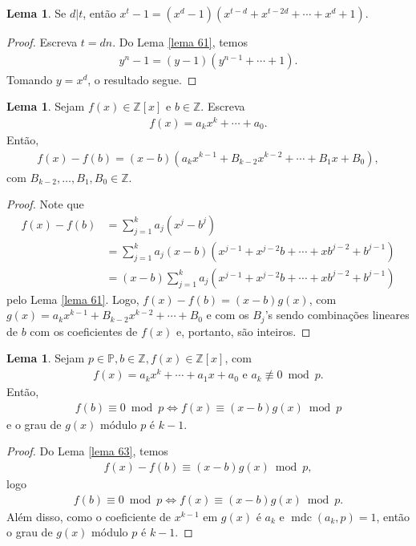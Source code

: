 \documentclass[a4paper,11pt,twoside, leqno]{article}
\DeclareMathOperator{\mdc}{mdc}
\theoremstyle{definition}
\newtheorem{lemma}[theorem]{Lema}
\begin{document}
\begin{lemma}
	\label{lema 62}
	Se $d|t$, então $x^t - 1 = (x^d - 1)(x^{t-d} + x^{t-2d} + \cdots + x^d + 1)$.
\end{lemma}
\begin{proof}
	Escreva $t = dn$. Do Lema \eqref{lema 61}, temos
	\begin{align*}
	y^n - 1 = (y-1)(y^{n-1} + \cdots + 1).
	\end{align*}
	Tomando $y = x^d$, o resultado segue.
\end{proof}
\begin{lemma}
	\label{lema 63}
	Sejam $f(x)\in\mathbb{Z}[x]$ e $b\in\mathbb{Z}$. Escreva
	\begin{align*}
	f(x) = a_kx^k + \cdots + a_0.
	\end{align*}
	Então, 
	\begin{align*}
	f(x) - f(b) = (x-b)(a_kx^{k-1} + B_{k-2}x^{k-2} + \cdots + B_1x + B_0),
	\end{align*}
	com $B_{k-2}, \dots, B_1, B_0\in\mathbb{Z}$.
\end{lemma}
\begin{proof}
	Note que 
	\begin{align*}
	f(x) - f(b) &= \sum_{j=1}^{k}a_j(x^j - b^j) \\
	&= \sum_{j=1}^{k}a_j(x-b)(x^{j-1} + x^{j-2}b + \cdots + xb^{j-2} + b^{j-1}) \\
	&= (x-b)\sum_{j=1}^{k}a_j(x^{j-1} + x^{j-2}b + \cdots + xb^{j-2} + b^{j-1})
	\end{align*}
	pelo Lema \eqref{lema 61}. Logo, $f(x) - f(b) = (x-b)g(x)$, com $g(x) = a_kx^{k-1} + B_{k-2}x^{k-2} + \cdots + B_0$ e com os $B_j$'s sendo combinações lineares de $b$ com os coeficientes de $f(x)$ e, portanto, são inteiros.
\end{proof}
\begin{lemma}
	\label{lema 64}
	Sejam $p\in\mathbb{P}, b\in\mathbb{Z}, f(x)\in\mathbb{Z}[x]$, com 
	\begin{align*}
	f(x) = a_kx^k + \cdots + a_1x + a_0 \text{ e } a_k\not\equiv 0\bmod p.
	\end{align*}
	Então,
	\begin{align*}
	f(b)\equiv 0\bmod p \Leftrightarrow f(x) \equiv (x-b)g(x)\bmod p
	\end{align*}
	e o grau de $g(x)$ módulo $p$ é $k-1$.
\end{lemma}
\begin{proof}
	Do Lema \eqref{lema 63}, temos
	\begin{align*}
	f(x) - f(b)\equiv (x-b)g(x)\bmod p,
	\end{align*}
	logo
	\begin{align*}
	f(b)\equiv 0\bmod p \Leftrightarrow f(x)\equiv (x-b)g(x)\bmod p.
	\end{align*}
	Além disso, como o coeficiente de $x^{k-1}$ em $g(x)$ é $a_k$ e $\mdc(a_k,p) = 1$, então o grau de $g(x)$ módulo $p$ é $k-1$.
\end{proof}
\end{document}
